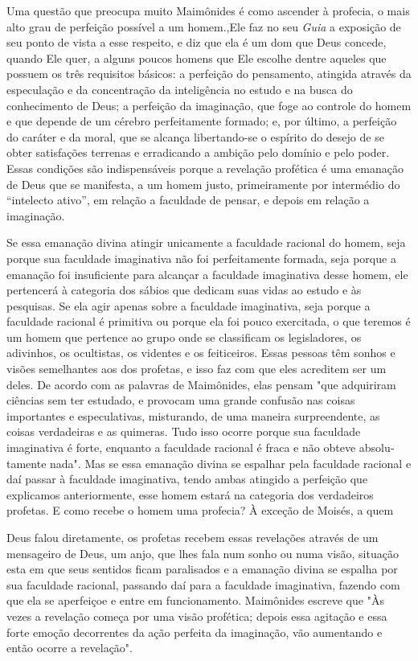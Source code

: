 Uma questão que preocupa muito Maimônides é como ascender à profecia, o
mais alto grau de perfeição possível a um homem.,Ele faz no seu
\emph{Guia} a exposição de seu ponto de vista a esse respeito, e diz que
ela é um dom que Deus concede, quando Ele quer, a alguns poucos homens
que Ele escolhe dentre aqueles que possuem os três requisitos básicos: a
perfeição do pensa­mento, atingida através da especulação e da
concentração da inteligência no estudo e na busca do conhecimento de
Deus; a perfeição da imaginação, que foge ao controle do homem e que
depende de um cérebro perfeitamente for­mado; e, por último, a perfeição
do caráter e da moral, que se alcança libertando-se o espírito do desejo
de se obter satisfações terrenas e erradicando a ambição pelo domínio e
pelo poder. Essas condições são indispensáveis porque a reve­lação
profética é uma emanação de Deus que se manifesta, a um homem justo,
primeiramente por intermédio do ``intelecto ativo'', em relação a
faculdade de pensar, e depois em relação a imaginação.

Se essa emanação divina atingir unicamente a faculdade racional do
homem, seja porque sua faculdade imaginativa não foi perfeitamente
formada, seja porque a emanação foi insuficiente para alcançar a
faculdade imaginativa desse homem, ele pertencerá à categoria dos sábios
que dedicam suas vidas ao estudo e às pesquisas. Se ela agir apenas
sobre a faculdade imaginativa, seja por­que a faculdade racional é
primitiva ou porque ela foi pouco exercitada, o que teremos é um homem
que pertence ao grupo onde se classificam os legislado­res, os
adivinhos, os ocultistas, os videntes e os feiticeiros. Essas pessoas
têm sonhos e visões semelhantes aos dos profetas, e isso faz com que
eles acredi­tem ser um deles. De acordo com as palavras de Maimônides,
elas pensam "que adquiriram ciências sem ter estudado, e provocam uma
grande confusão nas coisas importantes e especulativas, misturando, de
uma maneira surpreenden­te, as coisas verdadeiras e as quimeras. Tudo
isso ocorre porque sua faculdade imaginativa é forte, enquanto a
faculdade racional é fraca e não obteve absolu­tamente nada". Mas se
essa emanação divina se espalhar pela faculdade racio­nal e daí passar à
faculdade imaginativa, tendo ambas atingido a perfeição que explicamos
anteriormente, esse homem estará na categoria dos verdadeiros
profetas. E como recebe o homem uma profecia? À exceção de Moisés, a
quem

Deus falou diretamente, os profetas recebem essas revelações através de
um mensageiro de Deus, um anjo, que lhes fala num sonho ou numa visão,
situa­ção esta em que seus sentidos ficam paralisados e a emanação
divina se espalha por sua faculdade racional, passando daí para a
faculdade imaginativa, fazendo com que ela se aperfeiçoe e entre em
funcionamento. Maimônides escreve que "Às vezes a revelação começa por
uma visão profética; depois essa agitação e essa forte emoção
decorrentes da ação perfeita da imaginação, vão aumentan­do e então
ocorre a revelação".

